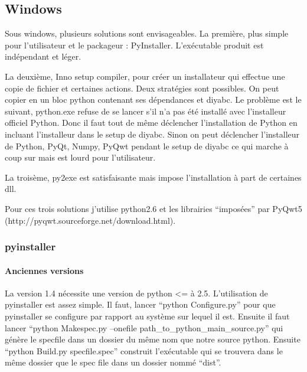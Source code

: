 \documentclass[12pt,a4paper]{article}
\begin{document}
    \subsection{Windows}
        Sous windows, plusieurs solutions sont envisageables. La première, plus simple pour l'utilisateur et le
        packageur : PyInstaller. L'ex\'ecutable produit est ind\'ependant et l\'eger. \newline

        La deuxième, Inno setup compiler, pour cr\'eer un installateur qui effectue une copie de fichier et certaines actions.
        Deux strat\'egies sont possibles. On peut copier en un bloc
        python contenant ses d\'ependances et diyabc. Le problème est le suivant, python.exe refuse de se lancer s'il n'a pas \'et\'e
        install\'e avec l'installeur officiel Python. Donc il faut tout de même d\'eclencher l'installation de Python en incluant
        l'installeur dans le setup de diyabc. Sinon on peut d\'eclencher l'installeur de Python, PyQt, Numpy, PyQwt pendant le setup de
        diyabc ce qui marche à coup sur mais est lourd pour l'utilisateur.\newline
        
        La troisème, py2exe est satisfaisante mais impose l'installation à part de certaines dll.\newline

        Pour ces trois solutions j'utilise python2.6 et les librairies ``impos\'ees'' par PyQwt5 (http://pyqwt.sourceforge.net/download.html).
        \subsubsection{pyinstaller}
        \paragraph{Anciennes versions}
        La version 1.4 nécessite une version de python <= à 2.5. L'utilisation de pyinstaller est assez simple. Il faut, 
        lancer ``python Configure.py'' pour que pyinstaller se configure par rapport au système sur lequel il est. Ensuite il faut
        lancer ``python Makespec.py --onefile path\_to\_python\_main\_source.py'' qui génère le specfile dans un dossier du même nom que
        notre source python. Ensuite ``python Build.py specfile.spec'' construit l'exécutable qui se trouvera dans le même dossier que le spec file
        dans un dossier nommé ``dist''.
\end{document}

